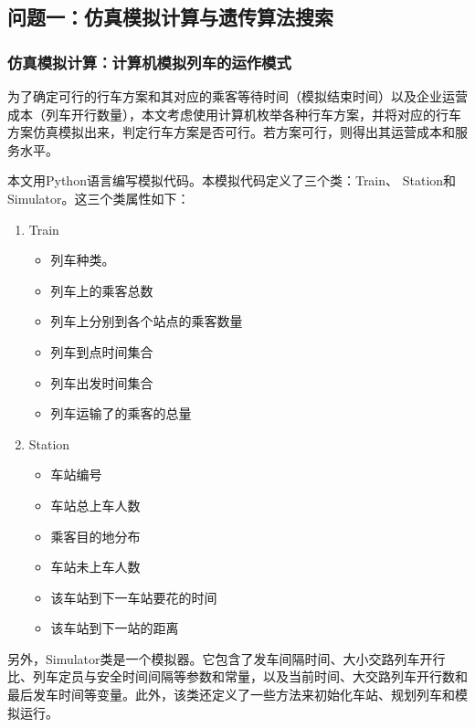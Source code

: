 
\subsection{问题一：仿真模拟计算与遗传算法搜索}

\subsubsection{仿真模拟计算：计算机模拟列车的运作模式}

为了确定可行的行车方案和其对应的乘客等待时间（模拟结束时间）以及企业运营成本（列车开行数量），本文考虑使用计算机枚举各种行车方案，并将对应的行车方案仿真模拟出来，判定行车方案是否可行。若方案可行，则得出其运营成本和服务水平。

本文用Python语言编写模拟代码。本模拟代码定义了三个类：Train、\newline
Station和Simulator。这三个类属性如下：

\begin{enumerate}
    \item Train
    \begin{itemize}
        \item 列车种类。
        \item 列车上的乘客总数
        \item 列车上分别到各个站点的乘客数量
        \item 列车到点时间集合
        \item 列车出发时间集合
        \item 列车运输了的乘客的总量
    \end{itemize}

    \item Station
    \begin{itemize}
        \item 车站编号
        \item 车站总上车人数
        \item 乘客目的地分布
        \item 车站未上车人数
        \item 该车站到下一车站要花的时间
        \item 该车站到下一站的距离
    \end{itemize}
\end{enumerate}

另外，Simulator类是一个模拟器。它包含了发车间隔时间、大小交路列车开行比、列车定员与安全时间间隔等参数和常量，以及当前时间、大交路列车开行数和最后发车时间等变量。此外，该类还定义了一些方法来初始化车站、规划列车和模拟运行。

